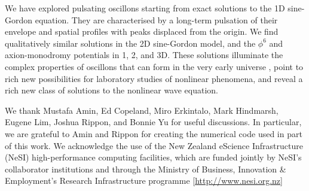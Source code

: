 \documentclass[%
reprint,
superscriptaddress,
amsmath,amssymb,
aps,
prl,
floatfix,
nofootinbib
]{revtex4-1}
\begin{document}
\medbreak{} We have explored  pulsating oscillons starting from exact solutions to the 1D sine-Gordon equation. They are characterised by a long-term pulsation of their envelope and spatial profiles with peaks displaced from the origin. We find qualitatively similar solutions in the  2D sine-Gordon model, and the $\phi^6$ and axion-monodromy potentials in 1, 2, and 3D. These solutions illuminate the complex properties of  oscillons that can form in the very early universe \cite{Amin:2011hj}, point to rich new possibilities for  laboratory  studies of nonlinear phenomena, and reveal a rich new class of solutions to the nonlinear wave equation.

\medbreak{}  We thank Mustafa Amin, Ed Copeland, Miro Erkintalo, Mark Hindmarsh, Eugene Lim, Joshua Rippon, and Bonnie Yu for useful discussions. In particular, we are grateful to Amin and Rippon for creating the numerical code used in part of this work.  We acknowledge the use of the New Zealand eScience Infrastructure (NeSI) high-performance computing facilities, which are funded jointly by NeSI's collaborator institutions and through the Ministry of Business, Innovation \& Employment's Research Infrastructure programme [\url{http://www.nesi.org.nz}]



\end{document}
